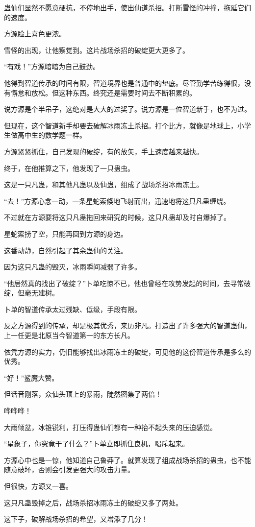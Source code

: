 \begin{this_body}
蛊仙们显然不愿意硬抗，不停地出手，使出仙道杀招。打断雪怪的冲撞，拖延它们的速度。

方源脸上喜色更浓。

雪怪的出现，让他察觉到。这片战场杀招的破绽更大更多了。

“有戏！”方源暗暗为自己鼓劲。

他得到智道传承的时间有限，智道境界也是普通中的垫底。尽管勤学苦练得很，没有懈怠和放松。但这种东西。终究还是需要时间去不断积累的。

说方源是个半吊子，这绝对是大大的过奖了。说方源是一位智道新手，也不为过。

但现在，这个智道新手却要去破解冰雨冻土杀招。打个比方，就像是地球上，小学生做高中生的数学题一样。

方源紧紧抓住，自己发现的破绽，有的放矢，手上速度越来越快。

终于，在他推算之下，他发现了一只蛊虫。

这是一只凡蛊，和其他凡蛊以及仙蛊，组成了战场杀招冰雨冻土。

“去！”方源心念一动，一条星蛇索倏地飞射而出，迅速地将这只凡蛊缠绕。

不过就在方源要将这只凡蛊拖回来研究的时候，这只凡蛊却及时自爆掉了。

星蛇索捞了空，只能再回到方源的身边。

这番动静，自然引起了其余蛊仙的关注。

因为这只凡蛊的毁灭，冰雨瞬间减弱了许多。

“他居然真的找出了破绽？”卜单吃惊不已，他也曾经在攻势发起的时间，去寻常破绽，但毫无建树。

卜单的智道传承太过残缺、低级，手段有限。

反之方源得到的传承，却是极其优秀，来历非凡。打造出了许多强大的智道蛊仙，上一任更是北原当今智道第一的东方长凡。

依凭方源的实力，仍旧能够找出冰雨冻土的破绽，可见他的这份智道传承是多么的优秀。

“好！”鲨魔大赞。

但话音刚落，众仙头顶上的暴雨，陡然密集了两倍！

哗哗哗！

大雨倾盆，冰锥锐利，打压得蛊仙们都有一种抬不起头来的压迫感觉。

“星象子，你究竟干了什么？”卜单立即抓住良机，喝斥起来。

方源心中也是一惊，他知道自己鲁莽了。就算发现了组成战场杀招的蛊虫，也不能随意破坏，否则会引发更强大的攻击力量。

但很快，方源又一喜。

这只凡蛊毁掉之后，战场杀招冰雨冻土的破绽又多了两处。

这下子，破解战场杀招的希望，又增添了几分！

\end{this_body}

